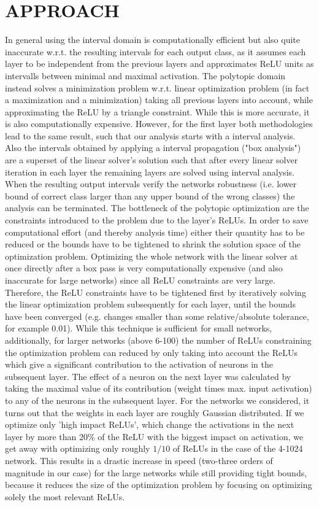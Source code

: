 \documentclass[letterpaper, 10 pt, conference]{ieeeconf}
\begin{document}
\section{APPROACH}
In general using the interval domain is computationally efficient but also quite inaccurate w.r.t. the resulting intervals for each output class, as it assumes each layer to be independent from the previous layers and approximates ReLU units as intervalls between minimal and maximal activation. The polytopic domain instead solves a minimization problem w.r.t. linear optimization problem (in fact a maximization and a minimization) taking all previous layers into account, while approximating the ReLU by a triangle constraint. While this is more accurate, it is also computationally expensive. However, for the first layer both methodologies lead to the same result, such that our analysis starts with a interval analysis. Also the intervals obtained by applying a interval propagation ("box analysis") are a superset of the linear solver's solution such that after every linear solver iteration in each layer the remaining layers are solved using interval analysis. When the resulting output intervals verify the networks robustness (i.e. lower bound of correct class larger than any upper bound of the wrong classes) the analysis can be terminated. 
\newline
The bottleneck of the polytopic optimization are the constraints introduced to the problem due to the layer's ReLUs. In order to save computational effort (and thereby analysis time) either their quantity has to be reduced or the bounds have to be tightened to shrink the solution space of the optimization problem. 
\newline
Optimizing the whole network with the linear solver at once directly after a box pass is very computationally expensive (and also inaccurate for large networks) since all ReLU constraints are very large. Therefore, the ReLU constraints have to be tightened first by iteratively solving the linear optimization problem subsequently for each layer, until the bounds have been converged (e.g. changes smaller than some relative/absolute tolerance, for example 0.01). 
\newline
While this technique is sufficient for small networks, additionally, for larger networks (above 6-100) the number of ReLUs constraining the optimization problem can reduced by only taking into account the ReLUs which give a significant contribution to the activation of neurons in the subsequent layer. The effect of a neuron on the next layer was calculated by taking the maximal value of its contribution (weight times max. input activation) to any of the neurons in the subsequent layer. For the networks we considered, it turns out that the weights in each layer are roughly Gaussian distributed. If we optimize only 'high impact ReLUs', which change the activations in the next layer by more than 20\% of the ReLU with the biggest impact on activation, we get away with optimizing only roughly $1/10$ of ReLUs in the case of the 4-1024 network. This results in a drastic increase in speed (two-three orders of magnitude in our case) for the large networks while still providing tight bounds, because it reduces the size of the optimization problem by focusing on optimizing solely the most relevant ReLUs.
\end{document}
